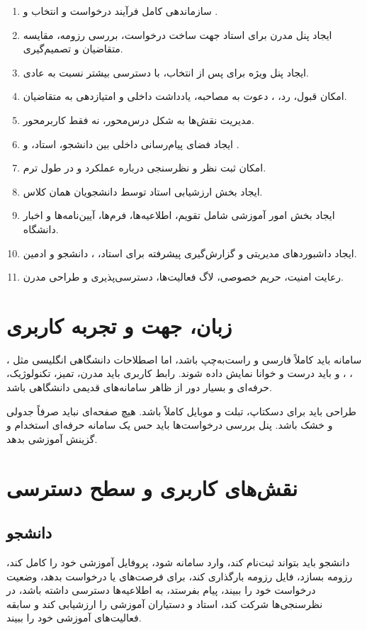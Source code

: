 \documentclass[12pt,a4paper]{article}
\begin{document}
\begin{enumerate}
\item سازماندهی کامل فرآیند درخواست و انتخاب  و .
\item ایجاد پنل مدرن برای استاد جهت ساخت درخواست، بررسی رزومه، مقایسه متقاضیان و تصمیم‌گیری.
\item ایجاد پنل ویژه برای  پس از انتخاب، با دسترسی بیشتر نسبت به  عادی.
\item امکان قبول، رد، ، دعوت به مصاحبه، یادداشت داخلی و امتیازدهی به متقاضیان.
\item مدیریت نقش‌ها به شکل درس‌محور، نه فقط کاربرمحور.
\item ایجاد فضای پیام‌رسانی داخلی بین دانشجو، استاد،  و .
\item امکان ثبت نظر و نظرسنجی درباره عملکرد  و  در طول ترم.
\item ایجاد بخش ارزشیابی استاد توسط دانشجویان همان کلاس.
\item ایجاد بخش امور آموزشی شامل تقویم، اطلاعیه‌ها، فرم‌ها، آیین‌نامه‌ها و اخبار دانشگاه.
\item ایجاد داشبوردهای مدیریتی و گزارش‌گیری پیشرفته برای استاد، ، دانشجو و ادمین.
\item رعایت امنیت، حریم خصوصی، لاگ فعالیت‌ها، دسترسی‌پذیری و طراحی مدرن.
\end{enumerate}

\section{زبان، جهت و تجربه کاربری}
سامانه باید کاملاً فارسی و راست‌به‌چپ باشد، اما اصطلاحات دانشگاهی انگلیسی مثل ، ، ،  و  باید درست و خوانا نمایش داده شوند. رابط کاربری باید مدرن، تمیز، تکنولوژیک، حرفه‌ای و بسیار دور از ظاهر سامانه‌های قدیمی دانشگاهی باشد.

طراحی باید برای دسکتاپ، تبلت و موبایل کاملاً  باشد. هیچ صفحه‌ای نباید صرفاً جدولی و خشک باشد. پنل بررسی درخواست‌ها باید حس یک سامانه حرفه‌ای استخدام و گزینش آموزشی بدهد.

\section{نقش‌های کاربری و سطح دسترسی}
\subsection{دانشجو}
دانشجو باید بتواند ثبت‌نام کند، وارد سامانه شود، پروفایل آموزشی خود را کامل کند، رزومه بسازد، فایل رزومه بارگذاری کند، برای فرصت‌های  یا  درخواست بدهد، وضعیت درخواست خود را ببیند، پیام بفرستد، به اطلاعیه‌ها دسترسی داشته باشد، در نظرسنجی‌ها شرکت کند، استاد و دستیاران آموزشی را ارزشیابی کند و سابقه فعالیت‌های آموزشی خود را ببیند.
\end{document}
